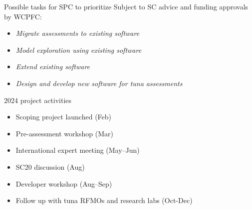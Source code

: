 \documentclass[aspectratio=169,fleqn]{beamer}
\begin{document}
\begin{frame}{Possible tasks for SPC to prioritize}
  Subject to SC advice and funding approvals by WCPFC:\\[3ex]
  \begin{itemize}
    \item {\orange\it Migrate assessments to existing software}\\[2ex]
    \item {\orange\it Model exploration using existing software}\\[2ex]
    \item {\orange\it Extend existing software}\\[2ex]
    \item {\orange\it Design and develop new software for tuna
      assessments}\\[2ex]
  \end{itemize}
\end{frame}


\begin{frame}{2024 project activities}
  \begin{itemize}
    \item[] Scoping project launched (Feb)\\[3ex]
    \item[] Pre-assessment workshop (Mar)\\[3ex]
    \item[] International expert meeting (May--Jun)\\[3ex]
    \item[] SC20 discussion (Aug)\\[3ex]
    \item[] Developer workshop (Aug--Sep)\\[3ex]
    \item[] Follow up with tuna RFMOs and research labs (Oct-Dec)\\[2ex]
  \end{itemize}
\end{frame}

\end{document}
